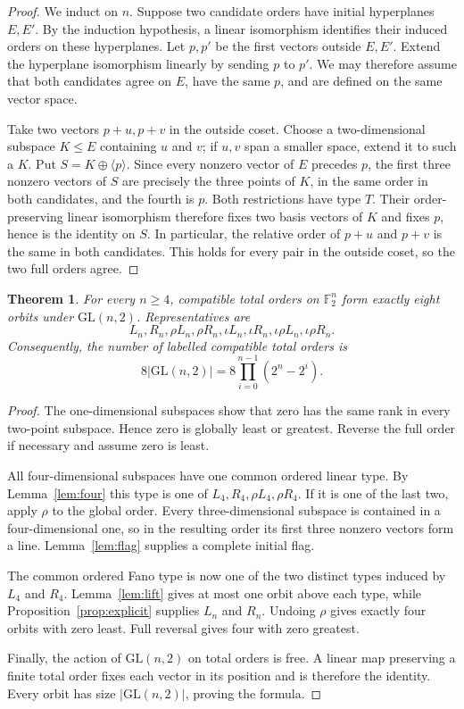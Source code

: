 \documentclass[11pt]{article}
\newtheorem{theorem}{Theorem}[section]
\begin{document}
\begin{proof}
We induct on $n$. Suppose two candidate orders have initial hyperplanes
$E,E'$. By the induction hypothesis, a linear isomorphism identifies their
induced orders on these hyperplanes. Let $p,p'$ be the first vectors outside
$E,E'$. Extend the hyperplane isomorphism linearly by sending $p$ to $p'$.
We may therefore assume that both candidates agree on $E$, have the same $p$,
and are defined on the same vector space.

Take two vectors $p+u,p+v$ in the outside coset. Choose a two-dimensional
subspace $K\le E$ containing $u$ and $v$; if $u,v$ span a smaller space,
extend it to such a $K$. Put $S=K\oplus\langle p\rangle$. Since every
nonzero vector of $E$ precedes $p$, the first three nonzero vectors of $S$
are precisely the three points of $K$, in the same order in both candidates,
and the fourth is $p$. Both restrictions have type $T$. Their
order-preserving linear isomorphism therefore fixes two basis vectors of $K$
and fixes $p$, hence is the identity on $S$. In particular, the relative
order of $p+u$ and $p+v$ is the same in both candidates. This holds for every
pair in the outside coset, so the two full orders agree.
\end{proof}

\begin{theorem}\label{thm:main}
For every $n\ge4$, compatible total orders on $\mathbb F_2^n$ form exactly
eight orbits under $\mathrm{GL}(n,2)$. Representatives are
\[
L_n,R_n,\rho L_n,\rho R_n,
\iota L_n,\iota R_n,\iota\rho L_n,\iota\rho R_n.
\]
Consequently, the number of labelled compatible total orders is
\[
\boxed{8|\mathrm{GL}(n,2)|
=8\prod_{i=0}^{n-1}(2^n-2^i)}.
\]
\end{theorem}

\begin{proof}
The one-dimensional subspaces show that zero has the same rank in every
two-point subspace. Hence zero is globally least or greatest. Reverse the
full order if necessary and assume zero is least.

All four-dimensional subspaces have one common ordered linear type. By
Lemma~\ref{lem:four} this type is one of
$L_4,R_4,\rho L_4,\rho R_4$. If it is one of the last two, apply $\rho$ to
the global order. Every three-dimensional subspace is contained in a
four-dimensional one, so in the resulting order its first three nonzero
vectors form a line. Lemma~\ref{lem:flag} supplies a complete initial flag.

The common ordered Fano type is now one of the two distinct types induced by
$L_4$ and $R_4$. Lemma~\ref{lem:lift} gives at most one orbit above each
type, while Proposition~\ref{prop:explicit} supplies $L_n$ and $R_n$.
Undoing $\rho$ gives exactly four orbits with zero least. Full reversal gives
four with zero greatest.

Finally, the action of $\mathrm{GL}(n,2)$ on total orders is free. A linear
map preserving a finite total order fixes each vector in its position and is
therefore the identity. Every orbit has size $|\mathrm{GL}(n,2)|$, proving
the formula.
\end{proof}
\end{document}
